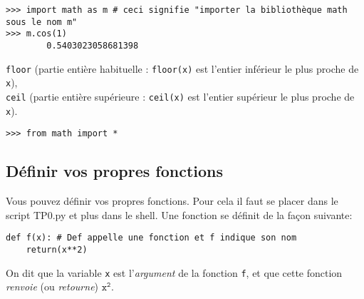 \begin{multicols}{2}
\begin{lstlisting}
>>> import math as m # ceci signifie "importer la bibliothèque math sous le nom m"
>>> m.cos(1)
        0.5403023058681398
\end{lstlisting}



\texttt{floor} (partie entière habituelle : \texttt{floor(x)} est l'entier inférieur le plus proche de \texttt{x}),\\
\texttt{ceil} (partie entière supérieure : \texttt{ceil(x)} est l'entier supérieur le plus proche de \texttt{x}).\\

\begin{lstlisting}
>>> from math import *
\end{lstlisting}


\subsection*{Définir vos propres fonctions}
Vous pouvez définir vos propres fonctions. Pour cela il faut se placer dans le script TP0.py et plus dans le shell. Une fonction se définit de la façon suivante:

\begin{lstlisting}
def f(x): # Def appelle une fonction et f indique son nom 
    return(x**2) 
\end{lstlisting}


On dit que la variable \texttt{x} est l'\emph{argument} de la fonction \texttt{f}, et que cette fonction \emph{renvoie} (ou \emph{retourne})   $\mathtt{x^2}$.\\


\end{multicols}
